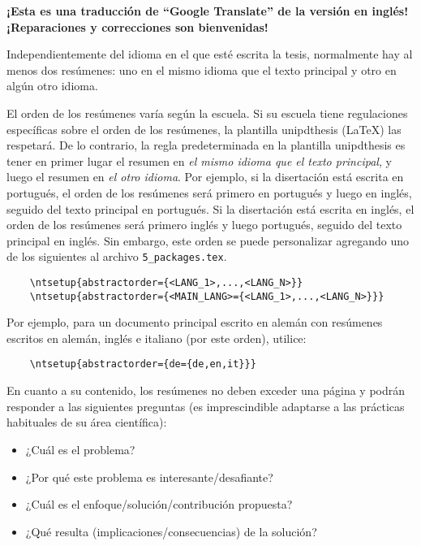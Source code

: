 
%


\textbf{¡Esta es una traducción de “Google Translate” de la versión en inglés! ¡Reparaciones y correcciones son bienvenidas!}

Independientemente del idioma en el que esté escrita la tesis, normalmente hay al menos dos resúmenes: uno en el mismo idioma que el texto principal y otro en algún otro idioma.

El orden de los resúmenes varía según la escuela. Si su escuela tiene regulaciones específicas sobre el orden de los resúmenes, la plantilla \gls{unipdthesis} (\LaTeX) las respetará. De lo contrario, la regla predeterminada en la plantilla \gls{unipdthesis} es tener en primer lugar el resumen en \emph{el mismo idioma que el texto principal}, y luego el resumen en \emph{el otro idioma}. Por ejemplo, si la disertación está escrita en portugués, el orden de los resúmenes será primero en portugués y luego en inglés, seguido del texto principal en portugués. Si la disertación está escrita en inglés, el orden de los resúmenes será primero inglés y luego portugués, seguido del texto principal en inglés.
%
Sin embargo, este orden se puede personalizar agregando uno de los siguientes al archivo \verb+5_packages.tex+.
%

\begin{verbatim}
    \ntsetup{abstractorder={<LANG_1>,...,<LANG_N>}}
    \ntsetup{abstractorder={<MAIN_LANG>={<LANG_1>,...,<LANG_N>}}}
\end{verbatim}

Por ejemplo, para un documento principal escrito en alemán con resúmenes escritos en alemán, inglés e italiano (por este orden), utilice:
\begin{verbatim}
    \ntsetup{abstractorder={de={de,en,it}}}
\end{verbatim}

En cuanto a su contenido, los resúmenes no deben exceder una página y podrán responder a las siguientes preguntas (es imprescindible adaptarse a las prácticas habituales de su área científica):

\begin{itemize}
  \item ¿Cuál es el problema?
  \item ¿Por qué este problema es interesante/desafiante?
  \item ¿Cuál es el enfoque/solución/contribución propuesta?
  \item ¿Qué resulta (implicaciones/consecuencias) de la solución?
\end{itemize}

